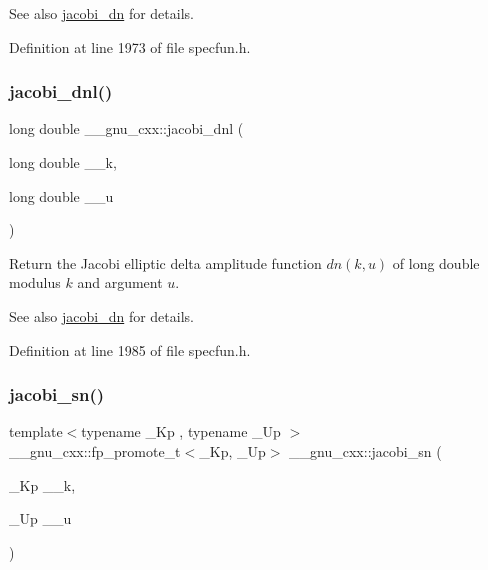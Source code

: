 \begin{DoxySeeAlso}{See also}
\hyperlink{group__gnu__math__spec__func_ga0f8fa8d6a77dbc2089d65f3f16876aa9}{jacobi\+\_\+dn} for details. 
\end{DoxySeeAlso}


Definition at line 1973 of file specfun.\+h.

\mbox{\label{group__gnu__math__spec__func_gae59786991abbf8359deef49b6323065a}} 
\subsubsection{\texorpdfstring{jacobi\+\_\+dnl()}{jacobi\_dnl()}}
{\footnotesize\ttfamily long double \+\_\+\+\_\+gnu\+\_\+cxx\+::jacobi\+\_\+dnl (\begin{DoxyParamCaption}\item[{long double}]{\+\_\+\+\_\+k,  }\item[{long double}]{\+\_\+\+\_\+u }\end{DoxyParamCaption})\hspace{0.3cm}{\ttfamily [inline]}}

Return the Jacobi elliptic delta amplitude function $ dn(k,u) $ of {\ttfamily long double} modulus $ k $ and argument $ u $.

\begin{DoxySeeAlso}{See also}
\hyperlink{group__gnu__math__spec__func_ga0f8fa8d6a77dbc2089d65f3f16876aa9}{jacobi\+\_\+dn} for details. 
\end{DoxySeeAlso}


Definition at line 1985 of file specfun.\+h.

\mbox{\label{group__gnu__math__spec__func_ga49d5e18152dd0dd0f496b8c8582e7045}} 
\subsubsection{\texorpdfstring{jacobi\+\_\+sn()}{jacobi\_sn()}}
{\footnotesize\ttfamily template$<$typename \+\_\+\+Kp , typename \+\_\+\+Up $>$ \\
\+\_\+\+\_\+gnu\+\_\+cxx\+::fp\+\_\+promote\+\_\+t$<$\+\_\+\+Kp, \+\_\+\+Up$>$ \+\_\+\+\_\+gnu\+\_\+cxx\+::jacobi\+\_\+sn (\begin{DoxyParamCaption}\item[{\+\_\+\+Kp}]{\+\_\+\+\_\+k,  }\item[{\+\_\+\+Up}]{\+\_\+\+\_\+u }\end{DoxyParamCaption})\hspace{0.3cm}{\ttfamily [inline]}}


